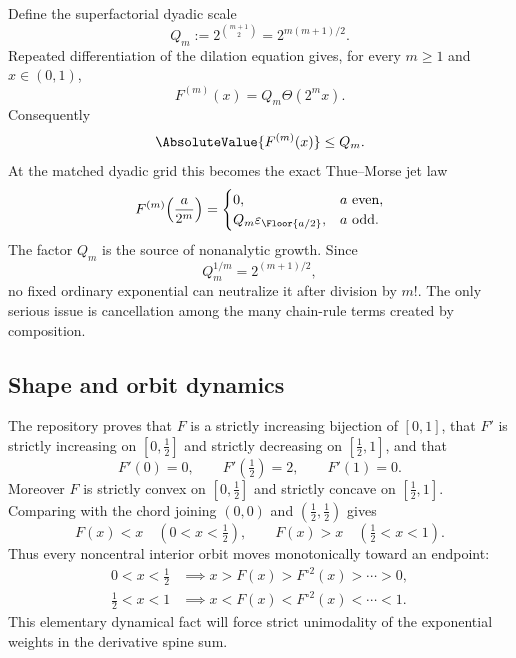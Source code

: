 \documentclass[11pt,oneside]{article}
\theoremstyle{definition}
\theoremstyle{remark}
\newcommand{\eps}{\varepsilon}
\newcommand{\comp}{\mathbin{\circ}}
\newcommand{\ThetaF}{\Theta}
\newcommand{\half}{\tfrac12}
\begin{document}
Define the superfactorial dyadic scale
\begin{equation}
  Q_m:=2^{\binom{m+1}{2}}=2^{m(m+1)/2}.
  \label{eq:Qm}
\end{equation}
Repeated differentiation of the dilation equation gives, for every $m\geq1$ and
$x\in(0,1)$,
\begin{equation}
  F^{(m)}(x)=Q_m\ThetaF(2^m x).
  \label{eq:derivative-atlas}
\end{equation}
Consequently
\begin{equation}
  \AbsoluteValue{F^{(m)}(x)}\leq Q_m.
  \label{eq:F-derivative-bound}
\end{equation}
At the matched dyadic grid this becomes the exact Thue--Morse jet law
\begin{equation}
 F^{(m)}\!\left(\frac{a}{2^m}\right)
 =\begin{cases}
 0,&a\text{ even},\\
 Q_m\eps_{\Floor{a/2}},&a\text{ odd}.
 \end{cases}
 \label{eq:dyadic-jet}
\end{equation}
The factor $Q_m$ is the source of nonanalytic growth.  Since
\begin{equation}
  Q_m^{1/m}=2^{(m+1)/2},
  \label{eq:Q-root}
\end{equation}
no fixed ordinary exponential can neutralize it after division by $m!$.
The only serious issue is cancellation among the many chain-rule terms created by
composition.

\subsection{Shape and orbit dynamics}

The repository proves that $F$ is a strictly increasing bijection of $[0,1]$, that
$F'$ is strictly increasing on $[0,\half]$ and strictly decreasing on
$[\half,1]$, and that
\begin{equation}
 F'(0)=0,\qquad F'(\half)=2,\qquad F'(1)=0.
 \label{eq:slope-values}
\end{equation}
Moreover $F$ is strictly convex on $[0,\half]$ and strictly concave on
$[\half,1]$.  Comparing with the chord joining $(0,0)$ and $(\half,\half)$ gives
\begin{equation}
  F(x)<x\quad(0<x<\half),
  \qquad
  F(x)>x\quad(\half<x<1).
  \label{eq:drift}
\end{equation}
Thus every noncentral interior orbit moves monotonically toward an endpoint:
\begin{align}
 0<x<\half&\implies x>F(x)>F^{\comp2}(x)>\cdots>0,
 \label{eq:left-orbit}\\
 \half<x<1&\implies x<F(x)<F^{\comp2}(x)<\cdots<1.
 \label{eq:right-orbit}
\end{align}
This elementary dynamical fact will force strict unimodality of the exponential
weights in the derivative spine sum.
\end{document}

